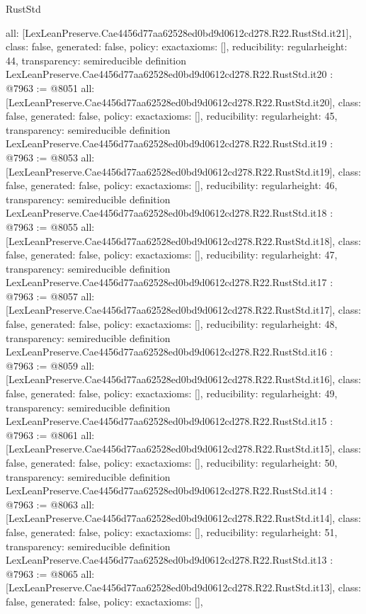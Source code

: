 \begin{lexlean}{RustStd}
\begin{coremodule}
{  all: [LexLeanPreserve.Cae4456d77aa62528ed0bd9d0612cd278.R22.RustStd.it21],
  class: false,
  generated: false,
  policy: exact{axioms: []},
  reducibility: regular{height: 44},
  transparency: semireducible
}
definition LexLeanPreserve.Cae4456d77aa62528ed0bd9d0612cd278.R22.RustStd.it20 : @7963 := @8051 {
  all: [LexLeanPreserve.Cae4456d77aa62528ed0bd9d0612cd278.R22.RustStd.it20],
  class: false,
  generated: false,
  policy: exact{axioms: []},
  reducibility: regular{height: 45},
  transparency: semireducible
}
definition LexLeanPreserve.Cae4456d77aa62528ed0bd9d0612cd278.R22.RustStd.it19 : @7963 := @8053 {
  all: [LexLeanPreserve.Cae4456d77aa62528ed0bd9d0612cd278.R22.RustStd.it19],
  class: false,
  generated: false,
  policy: exact{axioms: []},
  reducibility: regular{height: 46},
  transparency: semireducible
}
definition LexLeanPreserve.Cae4456d77aa62528ed0bd9d0612cd278.R22.RustStd.it18 : @7963 := @8055 {
  all: [LexLeanPreserve.Cae4456d77aa62528ed0bd9d0612cd278.R22.RustStd.it18],
  class: false,
  generated: false,
  policy: exact{axioms: []},
  reducibility: regular{height: 47},
  transparency: semireducible
}
definition LexLeanPreserve.Cae4456d77aa62528ed0bd9d0612cd278.R22.RustStd.it17 : @7963 := @8057 {
  all: [LexLeanPreserve.Cae4456d77aa62528ed0bd9d0612cd278.R22.RustStd.it17],
  class: false,
  generated: false,
  policy: exact{axioms: []},
  reducibility: regular{height: 48},
  transparency: semireducible
}
definition LexLeanPreserve.Cae4456d77aa62528ed0bd9d0612cd278.R22.RustStd.it16 : @7963 := @8059 {
  all: [LexLeanPreserve.Cae4456d77aa62528ed0bd9d0612cd278.R22.RustStd.it16],
  class: false,
  generated: false,
  policy: exact{axioms: []},
  reducibility: regular{height: 49},
  transparency: semireducible
}
definition LexLeanPreserve.Cae4456d77aa62528ed0bd9d0612cd278.R22.RustStd.it15 : @7963 := @8061 {
  all: [LexLeanPreserve.Cae4456d77aa62528ed0bd9d0612cd278.R22.RustStd.it15],
  class: false,
  generated: false,
  policy: exact{axioms: []},
  reducibility: regular{height: 50},
  transparency: semireducible
}
definition LexLeanPreserve.Cae4456d77aa62528ed0bd9d0612cd278.R22.RustStd.it14 : @7963 := @8063 {
  all: [LexLeanPreserve.Cae4456d77aa62528ed0bd9d0612cd278.R22.RustStd.it14],
  class: false,
  generated: false,
  policy: exact{axioms: []},
  reducibility: regular{height: 51},
  transparency: semireducible
}
definition LexLeanPreserve.Cae4456d77aa62528ed0bd9d0612cd278.R22.RustStd.it13 : @7963 := @8065 {
  all: [LexLeanPreserve.Cae4456d77aa62528ed0bd9d0612cd278.R22.RustStd.it13],
  class: false,
  generated: false,
  policy: exact{axioms: []},
}
\end{coremodule}
\end{lexlean}
